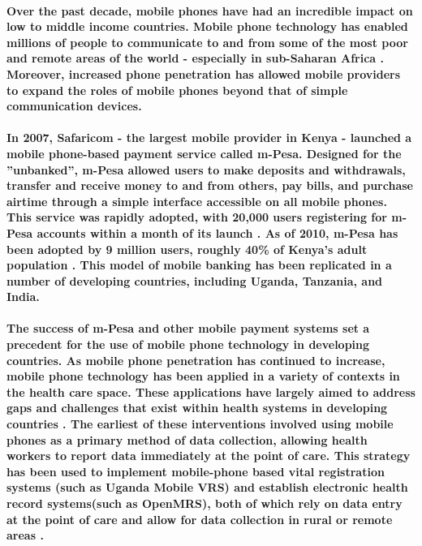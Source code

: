 \paragraph{Over the past decade, mobile phones have had an incredible impact on low to middle income countries. Mobile phone technology has enabled millions of people to communicate to and from some of the most poor and remote areas of the world - especially in sub-Saharan Africa \citep{Adler2007}. Moreover, increased phone penetration has allowed mobile providers to expand the roles of mobile phones  beyond that of simple communication devices.}

\paragraph{In 2007, Safaricom - the largest mobile provider in Kenya - launched a mobile phone-based payment service called m-Pesa. Designed for the ''unbanked'', m-Pesa allowed users to make deposits and withdrawals, transfer and receive money to and from others, pay bills, and purchase airtime through a simple interface accessible on all mobile phones. This service was rapidly adopted, with 20,000 users registering for m-Pesa accounts within a month of its launch \citep{Hughes2007}. As of 2010, m-Pesa has been adopted by 9 million users, roughly 40\% of Kenya's adult population \citep{Mas2010}. This model of mobile banking has been replicated in a number of developing countries, including Uganda, Tanzania, and India.}

\paragraph{The success of m-Pesa and other mobile payment systems set a precedent for the use of mobile phone technology in developing countries. As mobile phone penetration has continued to increase, mobile phone technology has been applied in a variety of contexts in the health care space. These applications have largely aimed to address gaps and challenges that exist within health systems in developing countries \citep{Labrique2013}. The earliest of these interventions involved using mobile phones as a primary method of data collection, allowing health workers to report data immediately at the point of care. This strategy has been used to implement mobile-phone based vital registration systems (such as Uganda Mobile VRS) and establish electronic health record systems(such as OpenMRS), both of which rely on data entry at the point of care and allow for data collection in rural or remote areas \citep{Labrique2013}.}

